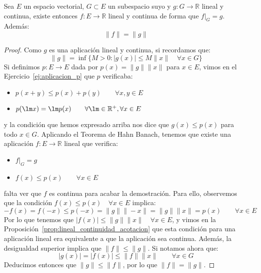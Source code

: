 \begin{coro}
    Sea $E$ un espacio vectorial, $G\subset E$ un subespacio suyo y $g:G\to \mathbb{R}$ lineal y continua, existe entonces $f:E\to \mathbb{R}$ lineal y continua de forma que $f\big|_G = g$. Además:
    \begin{equation*}
        \|f\| = \|g\|
    \end{equation*}
    \begin{proof}
        Como $g$ es una aplicación lineal y continua, si recordamos que:
        \begin{equation*}
            \|g\| = \inf \{M>0 : |g(x)| \leq M\|x\| \quad \forall x\in G\}
        \end{equation*}
        Si definimos $p:E\to E$ dada por $p(x) = \|g\|\|x\|$ para $x\in E$, vimos en el Ejercicio~\ref{ej:aplicacion_p} que $p$ verificaba:
        \begin{itemize}
            \item $p(x+y)\leq p(x) + p(y) \qquad \forall x,y\in E$
            \item $p(\lm x)=\lm p(x) \qquad \forall \lm \in \mathbb{R}^+, \forall x\in E$
        \end{itemize}
        y la condición que hemos expresado arriba nos dice que $g(x) \leq p(x)$ para todo $x\in G$. Aplicando el Teorema de Hahn Banach, tenemos que existe una aplicación $f:E\to \mathbb{R}$ lineal que verifica:
        \begin{itemize}
            \item $f\big|_G = g$
            \item $f(x) \leq p(x)\qquad \forall x\in E$
        \end{itemize}
        falta ver que $f$ es continua para acabar la demostración. Para ello, observemos que la condición $f(x) \leq p(x) \quad \forall x\in E$ implica:
        \begin{equation*}
            -f(x) = f(-x) \leq p(-x) = \|g\|\|- x\| = \|g\|\|x\| = p(x) \qquad \forall x\in E
        \end{equation*}
        Por lo que tenemos que $|f(x)| \leq \|g\|\|x\| \quad \forall x\in E$, y vimos en la Proposición~\ref{prop:lineal_continuidad_acotacion} que esta condición para una aplicación lineal era equivalente a que la aplicación sea continua. Además, la desigualdad superior implica que $\|f\| \leq \|g\|$. Si notamos ahora que:
        \begin{equation*}
            |g(x)| = |f(x)| \leq \|f\| \|x\| \qquad \forall x\in G
        \end{equation*}
        Deducimos entonces que $\|g\| \leq \|f\|$, por lo que $\|f\| = \|g\|$.
    \end{proof}
\end{coro}

